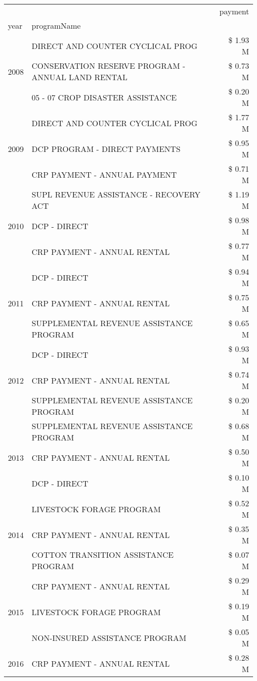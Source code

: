 \begin{tabular}{llr}
\toprule
 &  & payment \\
year & programName &  \\
\midrule
\multirow[t]{3}{*}{2008} & DIRECT AND COUNTER CYCLICAL PROG & \$ 1.93 M \\
 & CONSERVATION RESERVE PROGRAM - ANNUAL LAND RENTAL & \$ 0.73 M \\
 & 05 - 07 CROP DISASTER ASSISTANCE & \$ 0.20 M \\
\cline{1-3}
\multirow[t]{3}{*}{2009} & DIRECT AND COUNTER CYCLICAL PROG & \$ 1.77 M \\
 & DCP PROGRAM - DIRECT PAYMENTS & \$ 0.95 M \\
 & CRP PAYMENT - ANNUAL PAYMENT & \$ 0.71 M \\
\cline{1-3}
\multirow[t]{3}{*}{2010} & SUPL REVENUE ASSISTANCE - RECOVERY ACT & \$ 1.19 M \\
 & DCP - DIRECT & \$ 0.98 M \\
 & CRP PAYMENT - ANNUAL RENTAL & \$ 0.77 M \\
\cline{1-3}
\multirow[t]{3}{*}{2011} & DCP - DIRECT & \$ 0.94 M \\
 & CRP PAYMENT - ANNUAL RENTAL & \$ 0.75 M \\
 & SUPPLEMENTAL REVENUE ASSISTANCE PROGRAM & \$ 0.65 M \\
\cline{1-3}
\multirow[t]{3}{*}{2012} & DCP - DIRECT & \$ 0.93 M \\
 & CRP PAYMENT - ANNUAL RENTAL & \$ 0.74 M \\
 & SUPPLEMENTAL REVENUE ASSISTANCE PROGRAM & \$ 0.20 M \\
\cline{1-3}
\multirow[t]{3}{*}{2013} & SUPPLEMENTAL REVENUE ASSISTANCE PROGRAM & \$ 0.68 M \\
 & CRP PAYMENT - ANNUAL RENTAL & \$ 0.50 M \\
 & DCP - DIRECT & \$ 0.10 M \\
\cline{1-3}
\multirow[t]{3}{*}{2014} & LIVESTOCK FORAGE PROGRAM & \$ 0.52 M \\
 & CRP PAYMENT - ANNUAL RENTAL & \$ 0.35 M \\
 & COTTON TRANSITION ASSISTANCE PROGRAM & \$ 0.07 M \\
\cline{1-3}
\multirow[t]{3}{*}{2015} & CRP PAYMENT - ANNUAL RENTAL & \$ 0.29 M \\
 & LIVESTOCK FORAGE PROGRAM & \$ 0.19 M \\
 & NON-INSURED ASSISTANCE PROGRAM & \$ 0.05 M \\
\cline{1-3}
\multirow[t]{3}{*}{2016} & CRP PAYMENT - ANNUAL RENTAL & \$ 0.28 M \\

\end{tabular}
